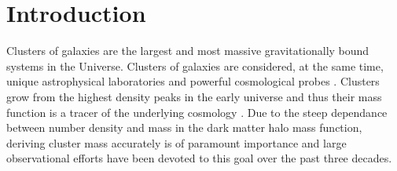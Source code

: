 \documentclass[apj,twocolumn]{emulateapj}
\begin{document}



\section{Introduction}

Clusters of galaxies are the largest and most massive gravitationally bound systems in the Universe. 
Clusters of galaxies are considered, at the same time, unique astrophysical laboratories and powerful cosmological probes \citep[e.g.,][]{White93, Bartlett94, Via99, Borgani01, Vikhlinin09, Rozo10, Mantz10, Allen11,Benson13, Bocquet15}. 
Clusters grow from the highest density peaks in the early universe and thus their mass function is a tracer of the underlying cosmology \citep[e.g.,][]{Press74, Bahcall93, Gonzalez 12}. 
Due to the steep dependance between number density and mass in the dark matter halo mass function, deriving cluster mass accurately is of paramount importance and large observational efforts have been devoted to this goal over the past three decades.
\end{document}
